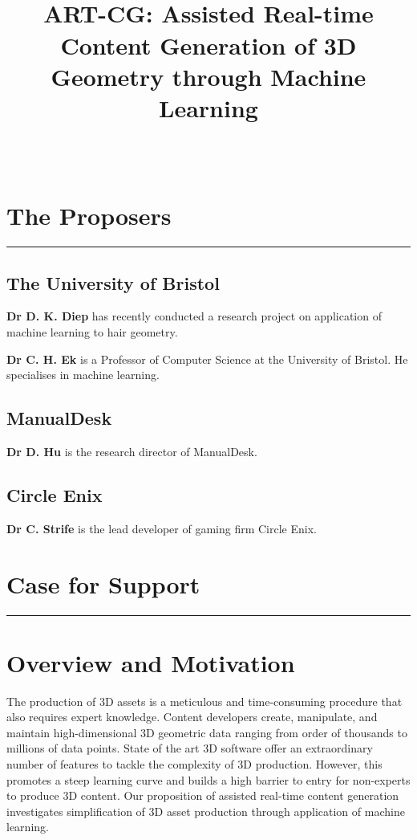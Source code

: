 \documentclass[a4paper, fontsize=15pt, onecolumn]{article} %
\title{
	\vspace{-3.0cm}
	\horrule{0.4pt} \\[0.2cm] %
	\vspace{0.2cm}
	\Large ART-CG: Assisted Real-time Content Generation of 3D Geometry through Machine Learning\\
	\horrule{0.4pt} \\[0cm] %
	\vspace{-0.5cm}
}
\date{} %
\numberwithin{equation}{section} %
\numberwithin{figure}{section} %
\numberwithin{table}{section} %
\begin{document}
\maketitle
\thispagestyle{fancy} %

\section*{The Proposers}
\hrule
\subsection*{The University of Bristol}
\textbf{Dr D. K. Diep} has recently conducted a research project on application of machine learning to hair geometry.

\textbf{Dr C. H. Ek} is a Professor of Computer Science at the University of Bristol. He specialises in machine learning.

\subsection*{ManualDesk}
\textbf{Dr D. Hu} is the research director of ManualDesk.

\subsection*{Circle Enix}
\textbf{Dr C. Strife} is the lead developer of gaming firm Circle Enix.

\newpage

\section*{Case for Support}
\hrule
\section{Overview and Motivation}
The production of 3D assets is a meticulous and time-consuming procedure that also requires expert knowledge. Content developers create, manipulate, and maintain high-dimensional 3D geometric data ranging from order of thousands to millions of data points. State of the art 3D software offer an extraordinary number of features to tackle the complexity of 3D production. However, this promotes a steep learning curve and builds a high barrier to entry for non-experts to produce 3D content. Our proposition of assisted real-time content generation investigates simplification of 3D asset production through application of machine learning.
\end{document}
